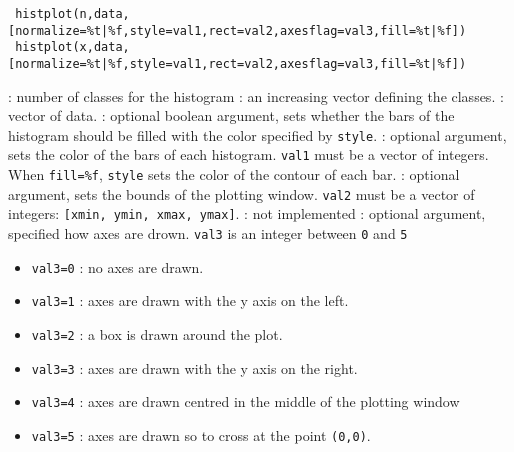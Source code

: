 
\begin{mandesc}
\end{mandesc}

\begin{calling_sequence}
\begin{verbatim}
 histplot(n,data,[normalize=%t|%f,style=val1,rect=val2,axesflag=val3,fill=%t|%f])
 histplot(x,data,[normalize=%t|%f,style=val1,rect=val2,axesflag=val3,fill=%t|%f])
\end{verbatim}
\end{calling_sequence}
\begin{parameters}
  \begin{varlist}
    : number of classes for the histogram
    : an increasing vector defining the classes.
    : vector of data.
    : optional boolean argument, sets whether the bars of the histogram
    should be filled with the color specified by \verb+style+.
    : optional  argument, sets the color of the bars of each
    histogram. \verb+val1+ must be a vector of integers.  When \verb+fill=%f+,
    \verb+style+ sets the color of the contour of each bar.
    : optional argument, sets the bounds of the plotting
    window. \verb+val2+ must be a vector of integers: \verb+[xmin, ymin, xmax, ymax]+.
    : not implemented
    : optional argument, specified how axes are
    drown. \verb+val3+ is an integer between \verb+0+ and \verb+5+
    \begin{itemize}
    \item \verb+val3=0+ : no axes are drawn.
    \item \verb+val3=1+ : axes are drawn with the y axis on the left.
    \item \verb+val3=2+ : a box is drawn around the plot.
    \item \verb+val3=3+ : axes are drawn with the y axis on the right.
    \item \verb+val3=4+ : axes are drawn centred in the middle of the plotting window
    \item \verb+val3=5+ : axes are drawn so to cross at the point \verb+(0,0)+.
    \end{itemize}

\end{varlist}
\end{parameters}

